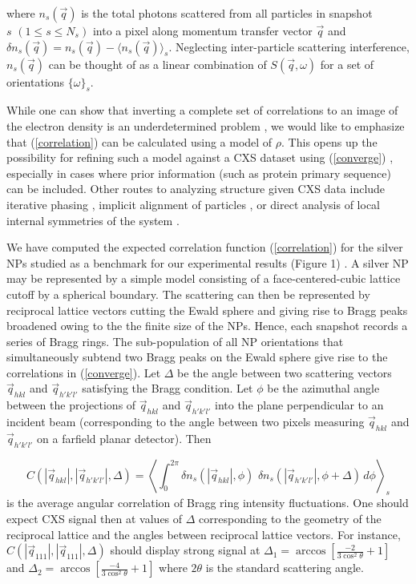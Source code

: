 \documentclass [11pt,fleqn]{article}
\def \be {\begin{equation}}
\def \ee {\end{equation}}
\begin{document}
where $n_{s}(\vec{q})$ is the total photons scattered from all particles in snapshot $s \,\,(1 \leq s \leq N_{s} )$ into a pixel along momentum transfer vector $\vec{q}$ and $\delta n_{s}(\vec{q}) = n_{s}(\vec{q}) - \langle n_{s}(\vec{q}) \rangle_{s}$. Neglecting inter-particle scattering interference, $n_{s}(\vec{q})$ can be thought of as a linear combination of $S(\vec{q},\omega)$ for a set of orientations $\{ \omega\}_{s}$. 

While one can show that inverting a complete set of correlations to an image of the electron density is an underdetermined problem \cite{Elser:2011ez}, we would like to emphasize that (\ref{correlation}) can be calculated using a model of $\rho$. This opens up the possibility for refining such a model against a CXS dataset using (\ref{converge}) \cite{Liu:2013dv, Chen:2013io, Saldin:2009jj}, especially in cases where prior information (such as protein primary sequence) can be included. Other routes to analyzing structure given CXS data include iterative phasing \cite{Saldin:2010bx}, implicit alignment of particles \cite{Poon:2013ia}, or direct analysis of local internal symmetries of the system \cite{Kurta:2012cb, Kurta:2013to}.

We have computed the expected correlation function (\ref{correlation}) for the silver NPs studied as a benchmark for our experimental results (Figure 1) . A silver NP may be represented by a simple model consisting of a face-centered-cubic lattice cutoff by a spherical boundary. The scattering can then be represented by reciprocal lattice vectors cutting the Ewald sphere and giving rise to Bragg peaks broadened owing to the the finite size of the NPs.  Hence, each snapshot records a series of  Bragg rings. The sub-population of all NP orientations that simultaneously subtend two Bragg peaks on the Ewald sphere give rise to the correlations in (\ref{converge}). Let $\Delta$ be the angle between two scattering vectors $\vec{q}_{hkl}$ and $\vec{q}_{h'k'l'}$ satisfying the Bragg condition. Let $\phi$ be the azimuthal angle between the projections of $\vec{q}_{hkl}$ and $\vec{q}_{h'k'l'}$ into the plane perpendicular to an incident beam (corresponding to the angle between two pixels measuring $\vec{q}_{hkl}$ and $\vec{q}_{h'k'l'}$ on a farfield planar detector). Then

\be \label{angular}
C (|\vec{q}_{hkl}|,|\vec{q}_{h'k'l'}|, \Delta  ) = \left \langle \int_{0}^{2\pi} \delta n_{s} (| \vec{q}_{hkl}|,\phi ) \,\, \delta n_{s} (|\vec{q}_{h'k'l'}|,\phi + \Delta )\, d\phi  \right \rangle_{s}
\ee
is the average angular correlation of Bragg ring intensity fluctuations. One should expect CXS signal then at values of $\Delta $ corresponding to the geometry of the reciprocal lattice and the angles between reciprocal lattice vectors. For instance, $C (|\vec{q}_{111}|,|\vec{q}_{111}|, \Delta  )$ should display strong signal at $\Delta_1 = \arccos[ \frac{-2}{3\cos^{2}\theta} + 1  ]$ and $\Delta_2 = \arccos[ \frac{-4}{3\cos^{2}\theta} + 1  ]$ where $2\theta$ is the standard scattering angle.
\end{document}
